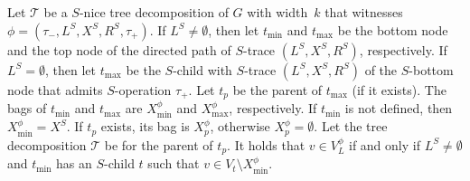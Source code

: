 \documentclass[a4paper,UKenglish,cleveref, autoref, thm-restate, numberwithinsect]{lipics-v2021}
\newcommand{\slim}{\text{slim}\xspace}
\newcommand{\topheavy}{\text{top-heavy}\xspace}
\begin{document}
\begin{lemma}\label{lem:vl}
Let $\mathcal{T}$ be a \slim $S$-nice tree decomposition of $G$ with width~$k$ that witnesses $\phi=(\tau_-,L^S, X^S, R^S,\tau_+)$. 
If $L^S\neq\emptyset$, then let $t_{\min}$ and $t_{\max}$ be the bottom node and the top node of the directed path of $S$-trace $(L^S, X^S, R^S)$, respectively. 
If $L^S=\emptyset$, then let $t_{\max}$ be the $S$-child with $S$-trace $(L^S, X^S, R^S)$ of the $S$-bottom node that admits $S$-operation $\tau_+$. 
Let $t_p$ be the parent of $t_{\max}$ (if it exists). 
The bags of $t_{\min}$ and $t_{\max}$ are $X^\phi_{\min}$ and $X^\phi_{\max}$, respectively. If $t_{\min}$ is not defined, then $X^\phi_{\min}=X^S$.
If $t_p$ exists, its bag is $X^\phi_p$, otherwise $X^\phi_p=\emptyset$.
Let the tree decomposition $\mathcal{T}$ be \topheavy for the parent of $t_p$. 
   It holds that $v\in V^\phi_L$ if and only if $L^S\neq \emptyset$ and $t_{\min}$ has an $S$-child $t$ such that $v\in V_t\setminus X^\phi_{\min}$.
\end{lemma}
\end{document}

